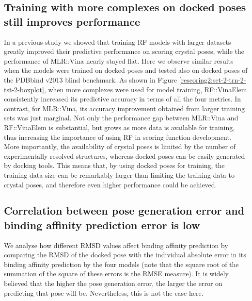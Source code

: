 \documentclass[twocolumn]{bmcart}
\begin{document}
\subsection*{Training with more complexes on docked poses still improves performance}

In a previous study \cite{1647} we showed that training RF models with larger datasets greatly improved their predictive performance on scoring crystal poses, while the performance of MLR::Vina nearly stayed flat. Here we observe similar results when the models were trained on docked poses and tested also on docked poses of the PDBbind v2013 blind benchmark. As shown in Figure \ref{rescoring2:set-2-trn-2-tst-2-boxplot}, when more complexes were used for model training, RF::VinaElem consistently increased its predictive accuracy in terms of all the four metrics. In contrast, for MLR::Vina, its accuracy improvement obtained from larger training sets was just marginal. Not only the performance gap between MLR::Vina and RF::VinaElem is substantial, but grows as more data is available for training, thus increasing the importance of using RF in scoring function development. More importantly, the availability of crystal poses is limited by the number of experimentally resolved structures, whereas docked poses can be easily generated by docking tools. This means that, by using docked poses for training, the training data size can be remarkably larger than limiting the training data to crystal poses, and therefore even higher performance could be achieved.

\subsection*{Correlation between pose generation error and binding affinity prediction error is low}

We analyse how different RMSD values affect binding affinity prediction by comparing the RMSD of the docked pose with the individual absolute error in its binding affinity prediction by the four models (note that the square root of the summation of the square of these errors is the RMSE measure). It is widely believed that the higher the pose generation error, the larger the error on predicting that pose will be. Nevertheless, this is not the case here.
\end{document}
